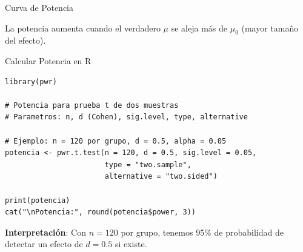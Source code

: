 \documentclass[aspectratio=169, 11pt]{beamer}
\begin{document}
\begin{frame}{Curva de Potencia}
\begin{center}
\end{center}

\vspace{0.3cm}
\small
La potencia aumenta cuando el verdadero $\mu$ se aleja más de $\mu_0$ (mayor tamaño del efecto).
\end{frame}

\begin{frame}[fragile]{Calcular Potencia en R}
\begin{lstlisting}
library(pwr)

# Potencia para prueba t de dos muestras
# Parametros: n, d (Cohen), sig.level, type, alternative

# Ejemplo: n = 120 por grupo, d = 0.5, alpha = 0.05
potencia <- pwr.t.test(n = 120, d = 0.5, sig.level = 0.05,
                       type = "two.sample",
                       alternative = "two.sided")

print(potencia)
cat("\nPotencia:", round(potencia$power, 3))
\end{lstlisting}

\vspace{0.2cm}
\textbf{Interpretación}: Con $n = 120$ por grupo, tenemos 95\% de probabilidad de detectar un efecto de $d = 0.5$ si existe.
\end{frame}
\end{document}
